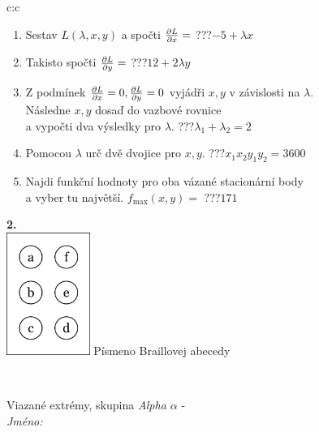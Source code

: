\documentclass[10pt]{report}
\begin{document}
\begin{tabular}{c:c}
\begin{minipage}[c][104.5mm][t]{0.5\linewidth}
\begin{center}
\begin{minipage}{0.79\linewidth}
\begin{center}
\begin{varwidth}{\linewidth}
\begin{enumerate}
\item Sestav $L(\lambda,x,y)$ a spočti $\pdv{L}{x}=$\quad \dotfill\; ???\;\dotfill \quad $-5+\lambda x$
\item Takisto spočti $\pdv{L}{y}=$\quad \dotfill\; ???\;\dotfill \quad $12+2\lambda y$
\item Z podmínek $\pdv{L}{x}=0 , \pdv{L}{y}=0$ vyjádři $x,y$ v závislosti na $\lambda$.\\ \phantom{xxxxxx}Následne $x,y$ dosaď do vazbové rovnice\\ \phantom{xxxxxx}a vypočti dva výsledky pro $\lambda$.\quad \dotfill\; ???\;\dotfill \quad $\lambda_1+\lambda_2=2$
\item Pomocou $\lambda$ urč dvě dvojice pro $x,y$.\quad \dotfill\; ???\;\dotfill \quad $x_1 x_2 y_1 y_2=3600$
\item Najdi funkční hodnoty pro oba vázané stacionární body\\ \phantom{xxxxxx}a vyber tu najvětší. $f_{\text{max}}(x,y)=$\quad \dotfill\; ???\;\dotfill \quad $171$
\end{enumerate}
\end{varwidth}
\end{center}
\end{minipage}
\begin{minipage}{0.20\linewidth}
\begin{center}
{\Huge\bfseries 2.} \\[2mm]
\includegraphics[height=40mm]{../images/braille.png}
{\small Písmeno Braillovej abecedy}
\end{center}
\end{minipage}
\end{center}
\end{minipage}
\\ \hdashline
\begin{minipage}[c][104.5mm][t]{0.5\linewidth}
\begin{center}
\vspace{7mm}
{\huge Viazané extrémy, skupina \textit{Alpha $\alpha$} -}\\[5mm]
\textit{Jméno:}\phantom{xxxxxxxxxxxxxxxxxxxxxxxxxxxxxxxxxxxxxxxxxxxxxxxxxxxxxxxxxxxxxxxxx}\\[5mm]

\end{center}
\end{minipage}
\end{tabular}
\end{document}
